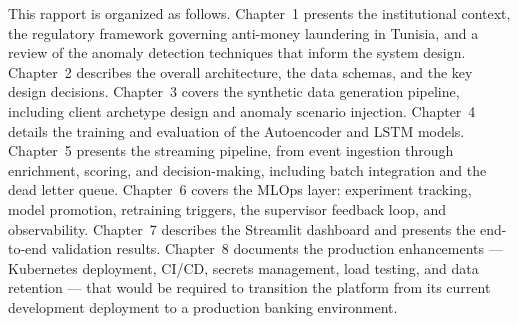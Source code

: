 This rapport is organized as follows. Chapter~1 presents the
institutional context, the regulatory framework governing anti-money
laundering in Tunisia, and a review of the anomaly detection techniques
that inform the system design. Chapter~2 describes the overall
architecture, the data schemas, and the key design decisions.
Chapter~3 covers the synthetic data generation pipeline, including
client archetype design and anomaly scenario injection. Chapter~4
details the training and evaluation of the Autoencoder and LSTM models.
Chapter~5 presents the streaming pipeline, from event ingestion through
enrichment, scoring, and decision-making, including batch integration
and the dead letter queue. Chapter~6 covers the MLOps layer: experiment
tracking, model promotion, retraining triggers, the supervisor feedback
loop, and observability. Chapter~7 describes the Streamlit dashboard
and presents the end-to-end validation results. Chapter~8 documents the
production enhancements --- Kubernetes deployment, CI/CD, secrets
management, load testing, and data retention --- that would be required
to transition the platform from its current development deployment to a
production banking environment.